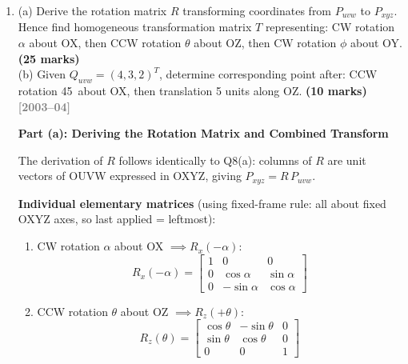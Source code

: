 \documentclass[12pt,a3paper]{article}
\newcommand{\yr}[1]{\hfill\textcolor{gray}{\small\textbf{[#1]}}}
\newcommand{\mk}[1]{\textcolor{orange!70!black}{\small\textbf{(#1 marks)}}}
\begin{document}
\begin{enumerate}
\begin{tcolorbox}[enhanced,breakable,ansbox,colback=cB!4,colframe=cB,
  boxrule=0.8pt,arc=5pt,
  title={\textbf{Answer}},fonttitle=\bfseries\color{white},
  colbacktitle=cB]
\textit{Note: The $-1.7678$ in $x$ and $y$ and $+4.3301$ in $z$
arise from $T_z(5)$ being mapped through the two rotations. The
rotations are applied first to the point, then about the rotated
intermediate positions.}

\end{tcolorbox}

\item \label{qlabel:C2-Q9}
(a) Derive the rotation matrix $R$ transforming coordinates from
$P_{uvw}$ to $P_{xyz}$. Hence find homogeneous transformation matrix $T$
representing: CW rotation $\alpha$ about OX, then CCW rotation $\theta$
about OZ, then CW rotation $\phi$ about OY. \mk{25}\\
(b) Given $Q_{uvw} = (4,3,2)^T$, determine corresponding point after:
CCW rotation 45\textdegree\ about OX, then translation 5 units along
OZ. \mk{10}
\yr{2003--04}

\begin{tcolorbox}[enhanced,breakable,ansbox,colback=cB!4,colframe=cB,
  boxrule=0.8pt,arc=5pt,
  title={\textbf{Answer}},fonttitle=\bfseries\color{white},
  colbacktitle=cB]

\textbf{Part (a): Deriving the Rotation Matrix and Combined Transform}

\medskip
The derivation of $R$ follows identically to Q8(a): columns of $R$ are
unit vectors of OUVW expressed in OXYZ, giving
$P_{xyz} = R\,P_{uvw}$.

\textbf{Individual elementary matrices} (using fixed-frame rule: all
about fixed OXYZ axes, so last applied = leftmost):

\begin{enumerate}[label=\textbf{\arabic*.}]
  \item CW rotation $\alpha$ about OX $\implies R_x(-\alpha)$:
    \[
      R_x(-\alpha) =
      \begin{bmatrix}
        1 & 0           & 0           \\
        0 & \cos\alpha  & \sin\alpha  \\
        0 & -\sin\alpha & \cos\alpha
      \end{bmatrix}
    \]

  \item CCW rotation $\theta$ about OZ $\implies R_z(+\theta)$:
    \[
      R_z(\theta) =
      \begin{bmatrix}
        \cos\theta & -\sin\theta & 0 \\
        \sin\theta &  \cos\theta & 0 \\
        0          &  0          & 1
      \end{bmatrix}
    \]


\end{enumerate}
\end{tcolorbox}
\end{enumerate}
\end{document}
